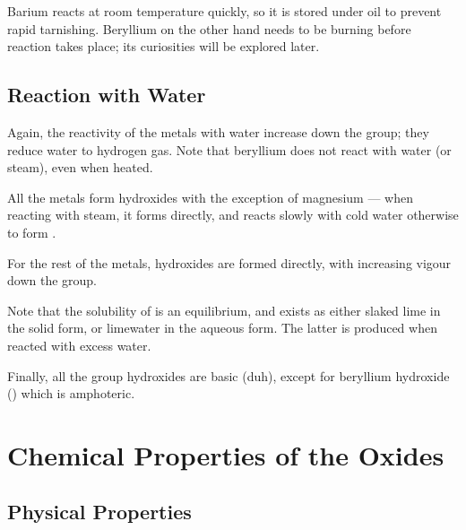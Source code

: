 			Barium reacts at room temperature quickly, so it is stored under oil to prevent rapid tarnishing. Beryllium on the other hand needs
			to be burning before  reaction takes place; its curiosities will be explored later.



		\pagebreak
		\subsection{Reaction with Water}

			Again, the reactivity of the metals with water increase down the group; they reduce water to
			hydrogen gas. Note that beryllium does not react with water (or steam), even when heated.

			All the metals form hydroxides with the exception of magnesium --- when reacting with steam,
			it forms  directly, and reacts slowly with cold water otherwise to form .


			For the rest of the metals, hydroxides are formed directly, with increasing vigour down the group.


			Note that the solubility of  is an equilibrium, and exists as either slaked lime in
			the solid form, or limewater in the aqueous form. The latter is produced when reacted with excess
			water.

			Finally, all the group \rtwo{} hydroxides are basic (duh), except for beryllium hydroxide
			() which is amphoteric.




	\section{Chemical Properties of the Oxides}

		\subsection{Physical Properties}

